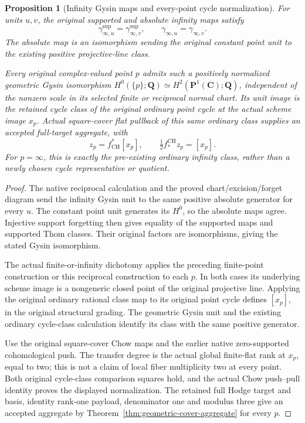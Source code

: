 \documentclass[11pt]{article}
\newtheorem{proposition}[theorem]{Proposition}
\theoremstyle{definition}
\theoremstyle{remark}
\DeclareMathOperator{\CH}{CH}
\newcommand{\Q}{\mathbf Q}
\begin{document}
\begin{proposition}[Infinity Gysin maps and every-point cycle normalization]
\label{prop:p1-infinity-gysin}
For units \(u,v\), the original supported and absolute infinity maps
satisfy
\[
 \gamma^{\mathrm{sup}}_{\infty,u}
   =\gamma^{\mathrm{sup}}_{\infty,v},
 \qquad \gamma_{\infty,u}=\gamma_{\infty,v}.
\]
The absolute map is an isomorphism sending the original constant point
unit to the existing positive projective-line class.

Every original complex-valued point \(p\) admits such a positively
normalized geometric Gysin isomorphism
\(H^0(\{p\};\Q)\simeq H^2(\mathbf P^1(\mathbf C);\Q)\),
independent of the nonzero scale in its selected finite or reciprocal
normal chart. Its unit image is the retained cycle class of the
original ordinary point cycle at the actual scheme image \(x_p\).
Actual square-cover flat pullback of this same ordinary class supplies
an accepted full-target aggregate, with
\[
 z_p=f_{\CH}^*[x_p],\qquad
 \tfrac12 f_*^{\CH}z_p=[x_p].
\]
For \(p=\infty\), this is exactly the pre-existing ordinary infinity
class, rather than a newly chosen cycle representative or quotient.
\end{proposition}
\begin{proof}
The native reciprocal calculation and the proved chart/excision/forget
diagram send the infinity Gysin unit to the same positive absolute
generator for every \(u\). The constant point unit generates its
\(H^0\), so the absolute maps agree. Injective support forgetting
then gives equality of the supported maps and supported Thom classes.
Their original factors are isomorphisms, giving the stated Gysin
isomorphism.

The actual finite-or-infinity dichotomy applies the preceding
finite-point construction or this reciprocal construction to each
\(p\). In both cases its underlying scheme image is a nongeneric
closed point of the original projective line. Applying the original
ordinary rational class map to its original point cycle defines
\([x_p]\), in the original structural grading. The geometric Gysin
unit and the existing ordinary cycle-class calculation identify its
class with the same positive generator.

Use the original square-cover Chow maps and the earlier native
zero-supported cohomological push. The transfer degree is the actual
global finite-flat rank at \(x_p\), equal to two; this is not a claim
of local fiber multiplicity two at every point. Both original
cycle-class comparison squares hold, and the actual Chow push--pull
identity proves the displayed normalization. The retained full Hodge
target and basis, identity rank-one payload, denominator one and
modulus three give an accepted aggregate by
Theorem~\ref{thm:geometric-cover-aggregate} for every \(p\).
\end{proof}
\end{document}
